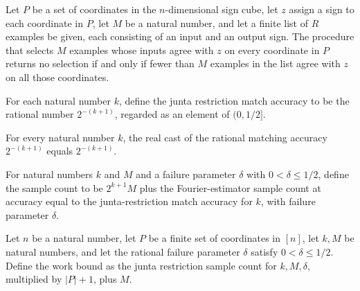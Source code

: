 \begin{theorem}
\label{FABL.takeMatchingJuntaExamples_eq_none_iff}
\leanok
{}
Let $P$ be a set of coordinates in the $n$-dimensional sign cube, let $z$ assign a sign
to each coordinate in $P$, let $M$ be a natural number, and let a finite list of $R$
examples be given, each consisting of an input and an output sign. The procedure that
selects $M$ examples whose inputs agree with $z$ on every coordinate in $P$ returns no
selection if and only if fewer than $M$ examples in the list agree with $z$ on all those
coordinates.
\end{theorem}

\begin{definition}
\label{FABL.juntaRestrictionMatchAccuracy}
\leanok
{}
For each natural number $k$, define the junta restriction match accuracy to be the
rational number $2^{-(k+1)}$, regarded as an element of $(0,1/2]$.
\end{definition}

\begin{theorem}
\label{FABL.juntaRestrictionMatchAccuracy_cast}
\leanok
{}
For every natural number $k$, the real cast of the rational matching accuracy
$2^{-(k+1)}$ equals $2^{-(k+1)}$.
\end{theorem}

\begin{definition}
\label{FABL.juntaRestrictionSampleCount}
\leanok
{}
For natural numbers $k$ and $M$ and a failure parameter $\delta$ with $0<\delta\leq
1/2$, define the sample count to be $2^{k+1}M$ plus the Fourier-estimator sample count
at accuracy equal to the junta-restriction match accuracy for $k$, with failure
parameter $\delta$.
\end{definition}

\begin{definition}
\label{FABL.juntaRestrictionSampleWork}
\leanok
{}
Let $n$ be a natural number, let $P$ be a finite set of coordinates in $[n]$, let $k,M$
be natural numbers, and let the rational failure parameter $\delta$ satisfy
$0<\delta\leq 1/2$. Define the work bound as the junta restriction sample count for
$k,M,\delta$, multiplied by $|P|+1$, plus $M$.
\end{definition}


